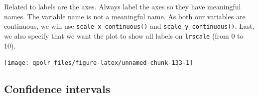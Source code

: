 \documentclass[12pt,oneside]{reedthesis}
\theoremstyle{definition}
\theoremstyle{definition}
\theoremstyle{definition}
\theoremstyle{remark}
\begin{document}
  Related to labels are the axes. Always label the axes so they have
  meaningful names. The variable name is not a meaningful name. As both
  our variables are continuous, we will use
  \texttt{scale\_x\_continuous()} and \texttt{scale\_y\_continuous()}.
  Last, we also specify that we want the plot to show all labels on
  \texttt{lrscale} (from 0 to 10).
  \begin{Shaded}
  \begin{Highlighting}[]
  \NormalTok{(}\OperatorTok{+}
  \StringTok{  }\NormalTok{(} \NormalTok{, }\NormalTok{) }\OperatorTok{+}\StringTok{ }
  \StringTok{  }\NormalTok{(}\NormalTok{, }\NormalTok{) }\OperatorTok{+}
  \StringTok{  }\NormalTok{(} \NormalTok{(}\NormalTok{, }\NormalTok{)) }\OperatorTok{+}
  \StringTok{  }\NormalTok{() }\OperatorTok{+}\StringTok{ }
  \StringTok{  }\NormalTok{(}
       \NormalTok{,}
       \NormalTok{,}
       
  \NormalTok{  ) }\OperatorTok{+}
  \StringTok{  }\NormalTok{(}\NormalTok{, }\OperatorTok{:}\NormalTok{, }\OperatorTok{:}\NormalTok{) }\OperatorTok{+}
  \StringTok{  }\NormalTok{(}\NormalTok{) }
  \end{Highlighting}
  \end{Shaded}
  \begin{center}\texttt{[image: qpolr\_files/figure-latex/unnamed-chunk-133-1]} \end{center}
  
  \subsection{Confidence intervals}\label{confidence-intervals}
  
\end{document}
